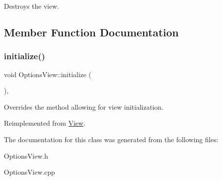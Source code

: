 Destroys the view. 



\subsection{Member Function Documentation}
\mbox{\label{class_options_view_a0b35f3f0d318997b9600f1da91d58916}} 
\subsubsection{\texorpdfstring{initialize()}{initialize()}}
{\footnotesize\ttfamily void Options\+View\+::initialize (\begin{DoxyParamCaption}{ }\end{DoxyParamCaption})\hspace{0.3cm}{\ttfamily [override]}, {\ttfamily [virtual]}}



Overrides the method allowing for view initialization. 



Reimplemented from \mbox{\hyperlink{class_view_a334fa9a19d2faca0120ef2869c3dd8ad}{View}}.



The documentation for this class was generated from the following files\+:\begin{DoxyCompactItemize}
\item 
Options\+View.\+h\item 
Options\+View.\+cpp\end{DoxyCompactItemize}
